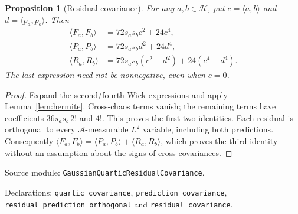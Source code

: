 \documentclass[11pt]{article}
\newtheorem{proposition}[theorem]{Proposition}
\newcommand{\Hh}{\mathcal H}\newcommand{\U}{\mathcal U}
\newcommand{\code}[1]{{\small\nolinkurl{#1}}}
\begin{document}
\begin{proposition}[Residual covariance]\label{prop:rescov}
For any $a,b\in\Hh$, put $c=\langle a,b\rangle$ and
$d=\langle p_a,p_b\rangle$. Then
\begin{align*}
 \langle F_a,F_b\rangle&=72s_as_bc^2+24c^4,\\
 \langle P_a,P_b\rangle&=72s_as_bd^2+24d^4,\\
 \langle R_a,R_b\rangle
 &=72s_as_b(c^2-d^2)+24(c^4-d^4).
\end{align*}
The last expression need not be nonnegative, even when $c=0$.
\end{proposition}
\begin{proof}
Expand the second/fourth Wick expressions and apply
Lemma~\ref{lem:hermite}. Cross-chaos terms vanish; the remaining terms
have coefficients $36s_as_b\,2!$ and $4!$. This proves the first two
identities. Each residual is orthogonal to every $\mathcal A$-measurable
$L^2$ variable, including both predictions. Consequently
$\langle F_a,F_b\rangle=\langle P_a,P_b\rangle+\langle R_a,R_b\rangle$,
which proves the third identity without an assumption about the signs of
cross-covariances.
\end{proof}
Source module: \code{GaussianQuarticResidualCovariance}.
\par\noindent Declarations: \code{quartic_covariance},
\code{prediction_covariance}, \code{residual_prediction_orthogonal}
and \code{residual_covariance}.
\end{document}
